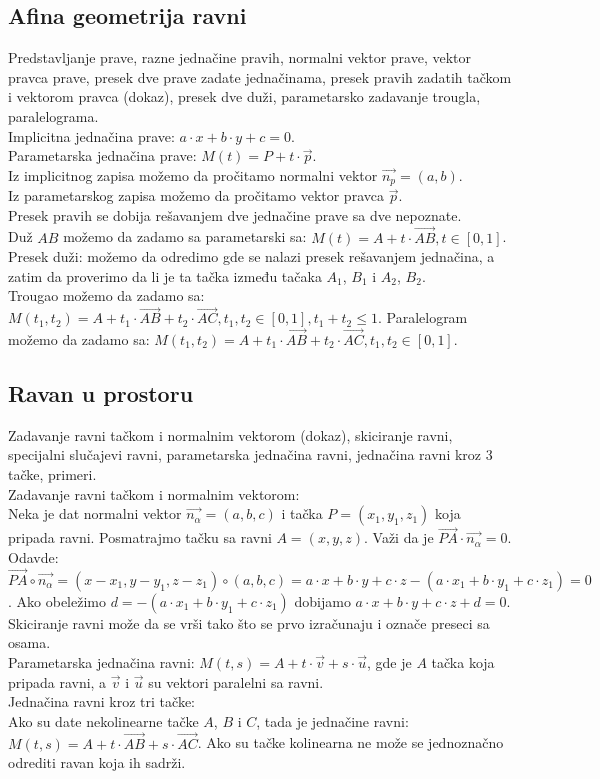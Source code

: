 \documentclass[12pt]{article}
\newcommand{\vek}[1]{\overrightarrow{#1}}
\begin{document}
\subsection{Afina geometrija ravni}
Predstavljanje prave, razne jednačine pravih, normalni
vektor prave, vektor pravca prave, presek dve prave zadate
jednačinama, presek pravih zadatih tačkom i vektorom pravca
(dokaz), presek dve duži, parametarsko zadavanje trougla,
paralelograma.
\\[1cm]
Implicitna jednačina prave: $a\cdot x+b\cdot y + c = 0$.\\
Parametarska jednačina prave: $M(t)=P+t\cdot \vek{p}$.\\
Iz implicitnog zapisa možemo da pročitamo normalni vektor $\vek{n_p}=(a,b)$.\\
Iz parametarskog zapisa možemo da pročitamo vektor pravca $\vek{p}$.\\
Presek pravih se dobija rešavanjem dve jednačine prave sa dve nepoznate.\\
Duž $AB$ možemo da zadamo sa parametarski sa: $M(t)=A+t\cdot \vek{AB}, t\in[0,1]$.\\
Presek duži: možemo da odredimo gde se nalazi presek rešavanjem jednačina,
a zatim da proverimo da li je ta tačka između tačaka $A_1$, $B_1$ i $A_2$, $B_2$.\\
Trougao možemo da zadamo sa: $M(t_1,t_2)=A+t_1\cdot \vek{AB}+t_2\cdot \vek{AC}, t_1, t_2\in[0,1], t_1+t_2\leq1$.
Paralelogram možemo da zadamo sa: $M(t_1,t_2)=A+t_1\cdot \vek{AB}+t_2\cdot \vek{AC}, t_1, t_2\in[0,1]$.
\par
\subsection{Ravan u prostoru}
Zadavanje ravni tačkom i normalnim vektorom (dokaz),
skiciranje ravni, specijalni slučajevi ravni, parametarska
jednačina ravni, jednačina ravni kroz 3 tačke, primeri.
\\[1cm]
Zadavanje ravni tačkom i normalnim vektorom:\\
Neka je dat normalni vektor $\vek{n_\alpha}=(a,b,c)$
i tačka $P=(x_1,y_1,z_1)$ koja pripada ravni.
Posmatrajmo tačku sa ravni $A=(x,y,z)$. Važi da
je $\vek{PA}\cdot\vek{n_\alpha}=0$.
Odavde:
$\vek{PA}\circ\vek{n_\alpha}=(x-x_1,y-y_1,z-z_1)\circ(a,b,c)=a\cdot x+b\cdot y+c\cdot z-(a\cdot x_1+b\cdot y_1+c\cdot z_1)=0$.
Ako obeležimo $d=-(a\cdot x_1+b\cdot y_1+c\cdot z_1)$ dobijamo $a\cdot x+b\cdot y+c\cdot z+d=0$.
Skiciranje ravni može da se vrši tako što se prvo izračunaju i označe preseci sa osama.\\
Parametarska jednačina ravni: $M(t,s)=A+t\cdot\vek{v}+s\cdot\vek{u}$,
gde je $A$ tačka koja pripada ravni, a $\vek{v}$ i $\vek{u}$
su vektori paralelni sa ravni.\\
Jednačina ravni kroz tri tačke:\\
Ako su date nekolinearne tačke $A$, $B$ i $C$, tada
je jednačine ravni: $M(t,s)=A+t\cdot\vek{AB}+s\cdot\vek{AC}$.
Ako su tačke kolinearna ne može se jednoznačno odrediti ravan koja ih sadrži.
\par
\end{document}

